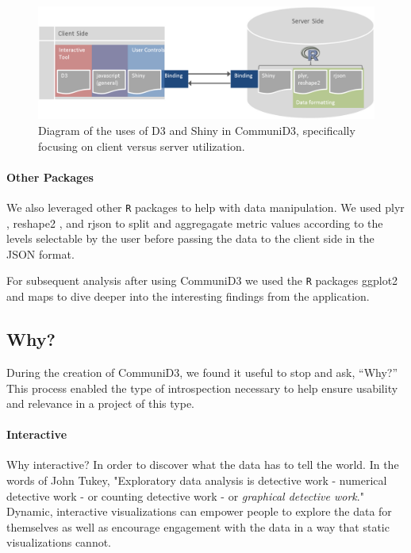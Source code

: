 \documentclass[11pt]{article}\usepackage{knitr}
\begin{document}
\begin{figure}[H]
\centering
\includegraphics[width=\textwidth]{images/D3shiny.png}
\caption{\label{fig:D3shiny} Diagram of the uses of D3 and Shiny in CommuniD3, specifically focusing on client versus server utilization.}
\end{figure}

\paragraph{Other Packages}
We also leveraged other {\tt R} packages to help with data manipulation. We used plyr \cite{plyr}, reshape2 \cite{reshape2}, and rjson \cite{rjson} to split and aggregagate metric values according to the levels selectable by the user before passing the data to the client side in the JSON format. 

For subsequent analysis after using CommuniD3 we used the {\tt R} packages ggplot2 \cite{ggplot2} and maps \cite{maps} to dive deeper into the interesting findings from the application.


\subsection*{Why?}
During the creation of CommuniD3, we found it useful to stop and ask, ``Why?'' This process enabled the type of introspection necessary to help ensure usability and relevance in a project of this type.

\paragraph{Interactive}
Why interactive? In order to discover what the data has to tell the world. In the words of John Tukey, "Exploratory data analysis is detective work - numerical detective work - or counting detective work - or \emph{graphical detective work}." \cite{tukey77} Dynamic, interactive visualizations can empower people to explore the data for themselves as well as encourage engagement with the data in a way that static visualizations cannot.
\end{document}
